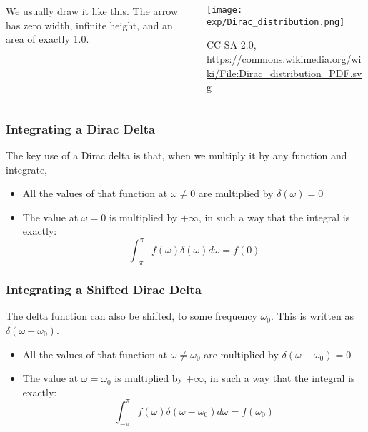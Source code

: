 \documentclass{beamer}
\begin{document}
\begin{frame}
  \begin{columns}
    \begin{column}{0.5\textwidth}
      We usually draw it like this.  The arrow has zero width,
      infinite height, and an area of exactly 1.0.
    \end{column}
    \begin{column}{0.5\textwidth}
      \begin{center}
        \texttt{[image: exp/Dirac\_distribution.png]}
        
        {\tiny CC-SA 2.0, \url{https://commons.wikimedia.org/wiki/File:Dirac_distribution_PDF.svg}}
      \end{center}
    \end{column}
  \end{columns}
\end{frame}

\begin{frame}
  \frametitle{Integrating a Dirac Delta}

  The key use of a Dirac delta is that, when we multiply it by any
  function and integrate,
  \begin{itemize}
  \item All the values of that function at $\omega\ne 0$ are multiplied by $\delta(\omega)=0$
  \item The value at $\omega=0$ is multiplied by $+\infty$, in such a
    way that the integral is exactly:
    \begin{displaymath}
      \int_{-\pi}^\pi f(\omega)\delta(\omega)d\omega = f(0)
    \end{displaymath}
  \end{itemize}
\end{frame}

\begin{frame}
  \frametitle{Integrating a Shifted Dirac Delta}

  The delta function can also be shifted, to some frequency
  $\omega_0$.  This is written as
  $\delta(\omega-\omega_0)$.
  \begin{itemize}
  \item All the values of that function at $\omega\ne \omega_0$ are
    multiplied by $\delta(\omega-\omega_0)=0$
  \item The value at $\omega=\omega_0$ is multiplied by $+\infty$, in such a
    way that the integral is exactly:
    \begin{displaymath}
      \int_{-\pi}^\pi f(\omega)\delta(\omega-\omega_0)d\omega = f(\omega_0)
    \end{displaymath}
  \end{itemize}
\end{frame}
\end{document}

